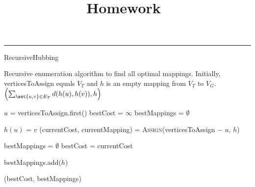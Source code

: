 \documentclass[language=english, number=1]{../lib/homework}
\title{\textbf{\hw@coursename}\\Homework~\hw@number}%
\begin{document}
    \maketitle
    \hrule

    \begin{algorithm}
        \caption{RecursiveHubbing}
        \label{alg:TriangulateStar}
        \begin{algorithmic}[1]
            \Statex Recursive enumeration algorithm to find all optimal mappings. Initially, verticesToAssign equals $V_T$ and $h$ is an empty mapping from $V_T$ to $V_G$.
                    \State \Return $\left(\sum_{\set{u, v} \in E_T} d(h(u), h(v)), h \right)$ 
                \EndIf

                \State $u$ = verticesToAssign.first()
                \State bestCost = $\infty$
                \State bestMappings = $\emptyset$

                    \State $h(u)$ = $v$
                    \State (currentCost, currentMapping) = \textsc{Assign}(verticesToAssign $-$ $u$, $h$)

                            \State bestMappings = $\emptyset$
                            \State bestCost = currentCost
                        \EndIf

                        \State bestMappings.add($h$)
                    \EndIf

                \EndFor

                \State \Return (bestCost, bestMappings)
            \EndProcedure
        \end{algorithmic}
    \end{algorithm}
\end{document}

